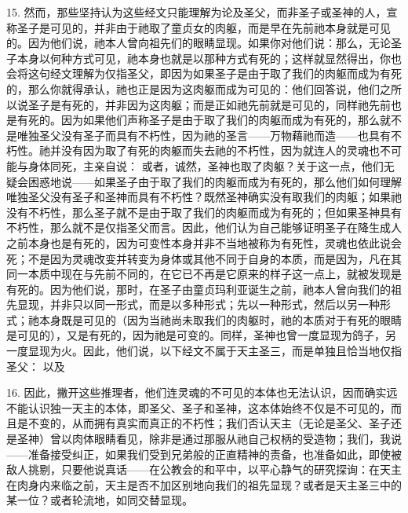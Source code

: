 15. 然而，那些坚持认为这些经文只能理解为论及圣父，而非圣子或圣神的人，宣称圣子是可见的，并非由于祂取了童贞女的肉躯，而是早在先前祂本身就是可见的。因为他们说，祂本人曾向祖先们的眼睛显现。如果你对他们说：那么，无论圣子本身以何种方式可见，祂本身也就是以那种方式有死的；这样就显然得出，你也会将这句经文理解为仅指圣父，即因为如果圣子是由于取了我们的肉躯而成为有死的，那么你就得承认，祂也正是因为这肉躯而成为可见的：他们回答说，他们之所以说圣子是有死的，并非因为这肉躯；而是正如祂先前就是可见的，同样祂先前也是有死的。因为如果他们声称圣子是由于取了我们的肉躯而成为有死的，那么就不是唯独圣父没有圣子而具有不朽性，因为祂的圣言——万物藉祂而造——也具有不朽性。祂并没有因为取了有死的肉躯而失去祂的不朽性，因为就连人的灵魂也不可能与身体同死，主亲自说： 或者，诚然，圣神也取了肉躯？关于这一点，他们无疑会困惑地说——如果圣子由于取了我们的肉躯而成为有死的，那么他们如何理解唯独圣父没有圣子和圣神而具有不朽性？既然圣神确实没有取我们的肉躯；如果祂没有不朽性，那么圣子就不是由于取了我们的肉躯而成为有死的；但如果圣神具有不朽性，那么就不是仅指圣父而言。因此，他们认为自己能够证明圣子在降生成人之前本身也是有死的，因为可变性本身并非不当地被称为有死性，灵魂也依此说会死；不是因为灵魂改变并转变为身体或其他不同于自身的本质，而是因为，凡在其同一本质中现在与先前不同的，在它已不再是它原来的样子这一点上，就被发现是有死的。因为他们说，那时，在圣子由童贞玛利亚诞生之前，祂本人曾向我们的祖先显现，并非只以同一形式，而是以多种形式；先以一种形式，然后以另一种形式；祂本身既是可见的（因为当祂尚未取我们的肉躯时，祂的本质对于有死的眼睛是可见的），又是有死的，因为祂是可变的。同样，圣神也曾一度显现为鸽子，另一度显现为火。因此，他们说，以下经文不属于天主圣三，而是单独且恰当地仅指圣父： 以及\par

16. 因此，撇开这些推理者，他们连灵魂的不可见的本体也无法认识，因而确实远不能认识独一天主的本体，即圣父、圣子和圣神，这本体始终不仅是不可见的，而且是不变的，从而拥有真实而真正的不朽性；我们否认天主（无论是圣父、圣子还是圣神）曾以肉体眼睛看见，除非是通过那服从祂自己权柄的受造物；我们，我说——准备接受纠正，如果我们受到兄弟般的正直精神的责备，也准备如此，即使被敌人挑剔，只要他说真话——在公教会的和平中，以平心静气的研究探询：在天主在肉身内来临之前，天主是否不加区别地向我们的祖先显现？或者是天主圣三中的某一位？或者轮流地，如同交替显现。\par

